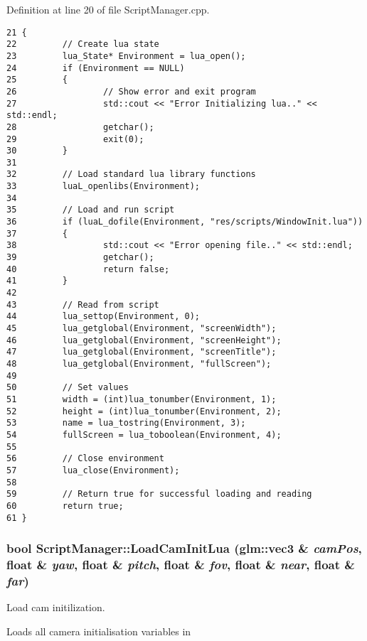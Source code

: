 Definition at line 20 of file ScriptManager.cpp.

\begin{Code}\begin{verbatim}21 {
22         // Create lua state
23         lua_State* Environment = lua_open();
24         if (Environment == NULL)
25         {
26                 // Show error and exit program
27                 std::cout << "Error Initializing lua.." << std::endl;
28                 getchar();
29                 exit(0);
30         }
31 
32         // Load standard lua library functions
33         luaL_openlibs(Environment);
34 
35         // Load and run script
36         if (luaL_dofile(Environment, "res/scripts/WindowInit.lua"))
37         {
38                 std::cout << "Error opening file.." << std::endl;
39                 getchar();
40                 return false;
41         }
42 
43         // Read from script
44         lua_settop(Environment, 0);
45         lua_getglobal(Environment, "screenWidth");
46         lua_getglobal(Environment, "screenHeight");
47         lua_getglobal(Environment, "screenTitle");
48         lua_getglobal(Environment, "fullScreen");
49 
50         // Set values
51         width = (int)lua_tonumber(Environment, 1);
52         height = (int)lua_tonumber(Environment, 2);
53         name = lua_tostring(Environment, 3);
54         fullScreen = lua_toboolean(Environment, 4);
55 
56         // Close environment
57         lua_close(Environment);
58 
59         // Return true for successful loading and reading
60         return true;
61 }
\end{verbatim}
\end{Code}


\hypertarget{class_script_manager_c8b552d0d8d0550e4425fcdaebee2ced}{
\subsubsection[LoadCamInitLua]{\setlength{\rightskip}{0pt plus 5cm}bool ScriptManager::LoadCamInitLua ({\bf glm::vec3} \& {\em camPos}, \/  float \& {\em yaw}, \/  float \& {\em pitch}, \/  float \& {\em fov}, \/  float \& {\em near}, \/  float \& {\em far})}}
\label{class_script_manager_c8b552d0d8d0550e4425fcdaebee2ced}


Load cam initilization. 

Loads all camera initialisation variables in

